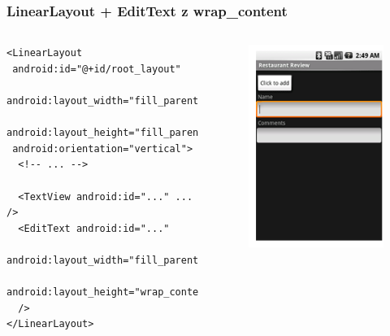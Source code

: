 \begin{frame}[fragile]\frametitle{LinearLayout + EditText z wrap\_content}
 \begin{columns}
  \begin{verbatim}
<LinearLayout
 android:id="@+id/root_layout"
 android:layout_width="fill_parent"
 android:layout_height="fill_parent"
 android:orientation="vertical">
  <!-- ... -->

  <TextView android:id="..." ... />
  <EditText android:id="..."
   android:layout_width="fill_parent"
   android:layout_height="wrap_content" 
  />
</LinearLayout>

  \end{verbatim}
  \begin{figure}
   \includegraphics[width=.7\textwidth]{images/linearlayout_wrap}   
  \end{figure}

 \end{columns}
\end{frame}

